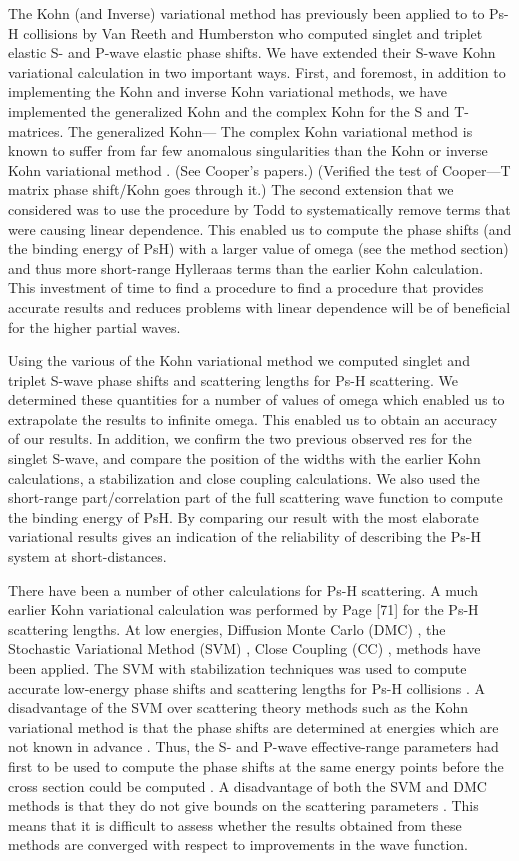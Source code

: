 \documentclass[preprint,showpacs,preprintnumbers,amsmath,amssymb]{revtex4}
\begin{document}
The Kohn (and Inverse) variational method has previously been applied to
to Ps-H collisions by 
Van Reeth and Humberston \cite{} who computed singlet and triplet elastic
S- and P-wave elastic phase shifts. 
We have extended their S-wave Kohn variational calculation in two important ways.
First, and foremost, in addition to implementing
the Kohn and inverse Kohn variational methods, we have
implemented the generalized Kohn and the complex Kohn
for the S and T-matrices. The generalized Kohn---
The complex Kohn variational method is known to suffer
from far few anomalous singularities than the
Kohn or inverse Kohn variational method \cite{}. 
(See Cooper's papers.) (Verified the test of Cooper---T matrix
phase shift/Kohn goes through it.)
The second extension that we considered was to use
the procedure by Todd to systematically remove terms that
were causing linear dependence.
This enabled us to compute the phase shifts (and the binding
energy of PsH) with a larger value of omega (see the method section)
and thus more short-range Hylleraas terms than the earlier 
Kohn calculation. 
This investment of time to find a procedure to find
a procedure that provides accurate results
and reduces problems with linear dependence
will be of beneficial for the higher partial waves.

Using the various of the Kohn variational method we 
computed singlet and triplet S-wave 
phase shifts and scattering lengths for Ps-H scattering.
We determined these quantities for a number of values
of omega which enabled us to
extrapolate the results to infinite omega.
This enabled us to obtain an accuracy of our results.
In addition, we confirm the two previous observed res
for the singlet S-wave, and compare the
position of the widths with the earlier Kohn calculations,
a stabilization and close coupling calculations.
We also used the short-range part/correlation part of
the full scattering wave function to compute
the binding energy of PsH.
By comparing our result with the most elaborate
variational results gives an indication of the
reliability  of describing the Ps-H system
at short-distances.

There have been a number of other calculations for
Ps-H scattering. A much earlier Kohn variational calculation was performed
by Page [71] for the Ps-H scattering lengths.
At low energies, Diffusion Monte Carlo (DMC) \cite{},
the Stochastic  Variational Method (SVM) \cite{}, Close Coupling (CC) \cite{}, 
 methods have been applied.
The SVM with stabilization techniques was used to compute
accurate low-energy phase shifts and scattering lengths for Ps-H collisions \cite{}.
A disadvantage of the SVM over scattering theory methods
such as the Kohn variational method is that the phase shifts
are  determined at energies which  are not  known in advance \cite{}.
Thus,  the S- and P-wave
effective-range parameters had first to be used to compute the phase shifts at the same energy
points before the cross section could be computed \cite{}. 
A disadvantage of both the SVM 
and DMC  methods is that they do not  give
bounds on the scattering parameters \cite{}.
This means that it is difficult to assess whether the results
obtained from these methods are converged with respect
to improvements in the wave function.
\end{document}
